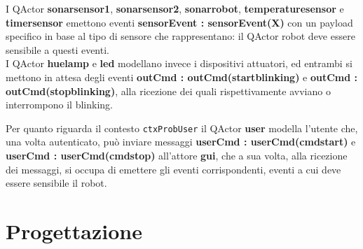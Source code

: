 \documentclass{llncs}
\newcommand{\action}[1]{\texttt{#1}\xspace}
\newcommand{\labelsec}[1]{\label{sec:#1}}
\begin{document}
I QActor \textbf{sonarsensor1}, \textbf{sonarsensor2}, \textbf{sonarrobot}, \textbf{temperaturesensor} e \textbf{timersensor} emettono eventi \textbf{sensorEvent : sensorEvent(X)} con un payload specifico in base al tipo di sensore che rappresentano: il QActor robot deve essere sensibile a questi eventi. \\
I QActor \textbf{huelamp} e \textbf{led} modellano invece i dispositivi attuatori, ed entrambi si mettono in attesa degli eventi \textbf{outCmd : outCmd(startblinking)} e \textbf{outCmd : outCmd(stopblinking)}, alla ricezione dei quali rispettivamente avviano o interrompono il blinking. 

Per quanto riguarda il contesto \action{ctxProbUser} il QActor \textbf{user} modella l'utente che, una volta autenticato, può inviare messaggi \textbf{userCmd : userCmd(cmdstart)} e \textbf{userCmd : userCmd(cmdstop)} all'attore \textbf{gui}, che a sua volta, alla ricezione dei messaggi, si occupa di emettere gli eventi corrispondenti, eventi a cui deve essere sensibile il robot. 


\section{Progettazione}
\labelsec{Project}







\end{document}
